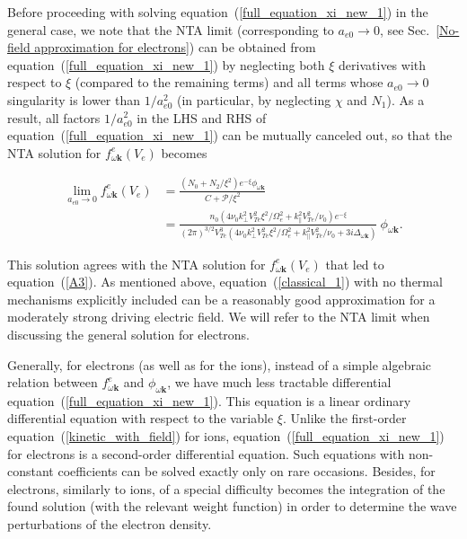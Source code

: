 \documentclass[draft]{agujournal2019}
\renewcommand{\vec}{\mathbf}
\begin{document}
Before proceeding with solving equation~(\ref{full_equation_xi_new_1}) in the
general case, we note that the NTA limit (corresponding to $a_{e0}\rightarrow 0$, 
see Sec.~\ref{No-field approximation for electrons})
can be obtained from equation~(\ref{full_equation_xi_new_1}) by
neglecting both $\xi$ derivatives with respect to $\xi$ (compared to the remaining terms) 
and all terms whose $a_{e0}\rightarrow 0$
singularity is lower than $1/a_{e0}^{2}$ (in particular, by neglecting $\chi$ and
$N_{1}$). As a result, all factors $1/a_{e0}^2$ in the LHS and RHS of 
equation~(\ref{full_equation_xi_new_1}) can be mutually canceled out, 
so that the NTA solution for $f_{\omega\vec{k}}^{e}(V_{e})$ becomes
\begin{linenomath*}
\begin{align}
\lim_{a_{e0}\rightarrow0}f_{\omega\vec{k}}^{e}(V_{e}) &  =\frac{\left(
N_{0}+N_{2}/\xi^{2}\right)  e^{-\xi}\phi_{\omega\vec{k}}}{C+\mathcal{P}%
/\xi^{2}}\nonumber\\
&  =\frac{n_{0}\left(  4\nu_{0}k_{\perp}^{2}V_{Te}^{2}\xi^{2}/\Omega_{e}%
^{2}+k_{\|}^{2}V_{Te}^{2}/\nu_{0}\right)  e^{-\xi}}{\left(
2\pi\right)  ^{3/2}V_{Te}^{3}\left(  4\nu_{0}k_{\perp}^{2}V_{Te}^{2}\xi
^{2}/\Omega_{e}^{2}+k_{\|}^{2}V_{Te}^{2}/\nu_{0}+3i\Delta_{\omega
\vec{k}}\right)  }\ \phi_{\omega\vec{k}}.
\label{classical_1}
\end{align}
\end{linenomath*}
This solution agrees with the NTA solution for $f_{\omega\vec{k}}^{e}(V_{e})$ that led to equation~(\ref{A3}).
As mentioned above, equation~(\ref{classical_1}) with no thermal mechanisms explicitly included can be a 
reasonably good approximation for a moderately strong driving electric field.
We will refer to the NTA limit when discussing the general solution for electrons. 

Generally, for electrons (as well as for the ions), instead of a simple
algebraic relation between $f_{\omega\vec{k}}^{e}$ and $\phi_{\omega\vec{k}}$,
we have much less tractable differential equation~(\ref{full_equation_xi_new_1}). This equation is a linear ordinary
differential equation with respect to the variable $\xi$. Unlike the
first-order equation~(\ref{kinetic_with_field}) for ions,
equation~(\ref{full_equation_xi_new_1}) for electrons is a second-order differential
equation. Such equations with non-constant coefficients can be
solved exactly only on rare occasions. Besides, for electrons, similarly to ions, of a special
difficulty becomes the integration of the found solution (with the relevant weight 
function) in order to determine the wave perturbations of the electron density.
\end{document}
